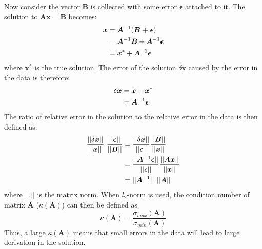 			Now consider the vector $\boldsymbol{B}$ is collected with some error $\boldsymbol{\epsilon}$ attached to it. 
			The solution to $\boldsymbol{Ax}=\boldsymbol{B}$ becomes:
			\begin{align}
				\boldsymbol{x}&=\boldsymbol{A}^{-1}(\boldsymbol{B+\epsilon}) \\\notag
				&= \boldsymbol{A}^{-1}\boldsymbol{B}+\boldsymbol{A}^{-1}\boldsymbol{\epsilon}\\\notag
				&= \boldsymbol{x}^*+\boldsymbol{A}^{-1}\boldsymbol{\epsilon}
			\end{align}
			where $\boldsymbol{x}^*$ is the true solution.
			The error of the solution $\delta \boldsymbol{x}$ caused by the error in the data is therefore:
			\begin{align}
			\delta \boldsymbol{x}&=\boldsymbol{x}-\boldsymbol{x}^*\\ \notag
			&=\boldsymbol{A}^{-1}\boldsymbol{\epsilon}
			\end{align}
			The ratio of relative error in the solution to the relative error in the data is then defined as:
			\begin{align}
			\frac{||\delta \boldsymbol{x}||}{||\boldsymbol{x}||}\ \frac{||\boldsymbol{\epsilon}|| }{||\boldsymbol{B}||}
			&=\frac{||\delta \boldsymbol{x}||}{||\boldsymbol{\epsilon}|| } \frac{||\boldsymbol{B}|| }{||\boldsymbol{x}||} \notag\\ 
			&= \frac{||\boldsymbol{A}^{-1}\boldsymbol{\epsilon}||}{||\boldsymbol{\epsilon}|| } \frac{||\boldsymbol{Ax}|| }{||\boldsymbol{x}||} \notag\\
			&= ||\boldsymbol{A}^{-1}||\ ||\boldsymbol{A}||
			\end{align}
			where $||.||$ is the matrix norm.
			When $l_2$-norm is used, the condition number of matrix $\boldsymbol{A}$  ($\kappa(\boldsymbol{A})$) can then be defined as
			$$
			\kappa(\boldsymbol{A}) = \frac{\sigma_{max}(\boldsymbol{A})}{\sigma_{min}(\boldsymbol{A})}
			$$
			Thus, a large $\kappa(\boldsymbol{A})$ means that small errors in the data will lead to large derivation in the solution.
				
